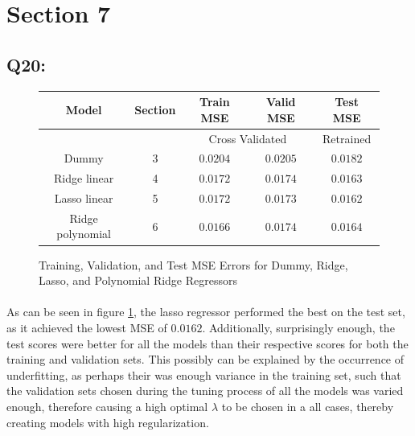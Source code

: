 \documentclass{article}
\begin{document}
\section*{Section 7}
\subsection*{Q20:}
    \begin{figure}[H]
        \centering
        \begin{tabular}{|c|c|c|c|c|}
            \hline
            \rowcolor{gray!60}
            Model & Section & Train MSE & Valid MSE & Test MSE\\ \hline
            \rowcolor{gray!20}
            ~&~ & \multicolumn{2}{c|}{Cross Validated} & Retrained \\ \hline
            Dummy & 3 & $0.0204$ & $0.0205$ & $0.0182$\\ \hline
            Ridge linear & 4 & $0.0172$ & $0.0174$ & $0.0163$\\ \hline
            Lasso linear & 5 & $0.0172$ & $0.0173$ & $0.0162$\\ \hline
            Ridge polynomial & 6 & $0.0166$ & $0.0174$ & $0.0164$\\ \hline
        \end{tabular}
        \caption{Training, Validation, and Test MSE Errors for Dummy, Ridge, Lasso, and Polynomial Ridge Regressors}
        \label{fig:q20}
    \end{figure}
    \paragraph*{}
    As can be seen in figure \ref{fig:q20}, the lasso regressor performed the best on the test set, as it achieved the lowest MSE of $0.0162$. Additionally, surprisingly enough, the test scores were better for all the models than their respective scores for both the training and validation sets. This possibly can be explained by the occurrence of underfitting, as perhaps their was enough variance in the training set, such that the validation sets chosen during the tuning process of all the models was varied enough, therefore causing a high optimal $\lambda$ to be chosen in a all cases, thereby creating models with high regularization. 
\end{document}
